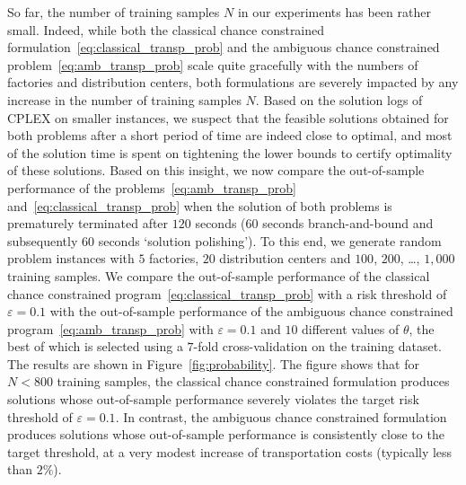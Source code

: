 \documentclass[nonblindrev]{informs2017}
\newcommand{\1}[1]{\mathds{1}{\left(#1\right)}}
\begin{document}
So far, the number of training samples $N$ in our experiments has been rather small. Indeed, while both the classical chance constrained formulation~\eqref{eq:classical_transp_prob} and the ambiguous chance constrained problem~\eqref{eq:amb_transp_prob} scale quite gracefully with the numbers of factories and distribution centers, both formulations are severely impacted by any increase in the number of training samples $N$. Based on the solution logs of CPLEX on smaller instances, we suspect that the feasible solutions obtained for both problems after a short period of time are indeed close to optimal, and most of the solution time is spent on tightening the lower bounds to certify optimality of these solutions. Based on this insight, we now compare the out-of-sample performance of the problems~\eqref{eq:amb_transp_prob} and~\eqref{eq:classical_transp_prob} when the solution of both problems is prematurely terminated after $120$ seconds ($60$ seconds branch-and-bound and subsequently $60$ seconds `solution polishing'). To this end, we generate random problem instances with $5$ factories, $20$ distribution centers and $100$, $200$, \ldots, $1{,}000$ training samples. We compare the out-of-sample performance of the classical chance constrained program~\eqref{eq:classical_transp_prob} with a risk threshold of $\varepsilon = 0.1$ with the out-of-sample performance of the ambiguous chance constrained program~\eqref{eq:amb_transp_prob} with $\varepsilon = 0.1$ and $10$ different values of $\theta$, the best of which is selected using a $7$-fold cross-validation on the training dataset. The results are shown in Figure~\ref{fig:probability}. The figure shows that for $N < 800$ training samples, the classical chance constrained formulation produces solutions whose out-of-sample performance severely violates the target risk threshold of $\varepsilon = 0.1$. In contrast, the ambiguous chance constrained formulation produces solutions whose out-of-sample performance is consistently close to the target threshold, at a very modest increase of transportation costs (typically less than $2\%$).
\end{document}
